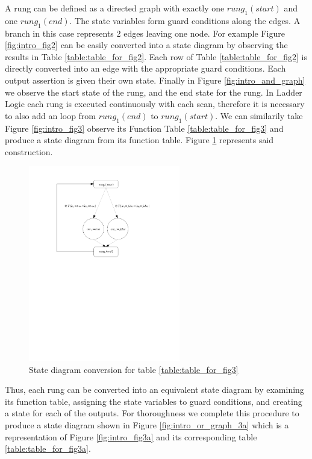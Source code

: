 A rung can be defined as a directed graph with exactly one $rung_1(start)$ and one $rung_1(end)$. The state variables form guard conditions along the edges. A branch in this case represents 2 edges leaving one node. For example Figure \ref{fig:intro_fig2}
can be easily converted into a state diagram by observing the results in Table \ref{table:table_for_fig2}. 
Each row of Table \ref{table:table_for_fig2} is directly converted into an edge with the appropriate guard conditions.
Each output assertion is given their own state. Finally in Figure \ref{fig:intro_and_graph} we observe the start state of the rung, and the end state for the rung. In Ladder Logic each rung is executed continuously with each scan, therefore it is necessary to also add an loop from $rung_1(end)$ to $rung_1(start)$. We can similarily take Figure \ref{fig:intro_fig3} observe its Function Table \ref{table:table_for_fig3} and produce a state diagram from its function table. Figure \ref{fig:intro_or_graph} represents said construction.


\begin{figure}[h]
    \centering
    \includegraphics[trim= 00mm 140mm 40mm 10mm, clip, width=250px]{./images/intro_or_graph.pdf} %
    \caption{State diagram conversion for table \ref{table:table_for_fig3}}
    \label{fig:intro_or_graph}
\end{figure}

Thus, each rung can be converted into an equivalent state diagram by examining its 
function table, assigning the state variables to guard conditions, and creating a
state for each of the outputs. For thoroughness we complete this procedure to produce
a state diagram shown in Figure \ref{fig:intro_or_graph_3a} which is a representation of 
Figure \ref{fig:intro_fig3a} and its
corresponding table \ref{table:table_for_fig3a}.


